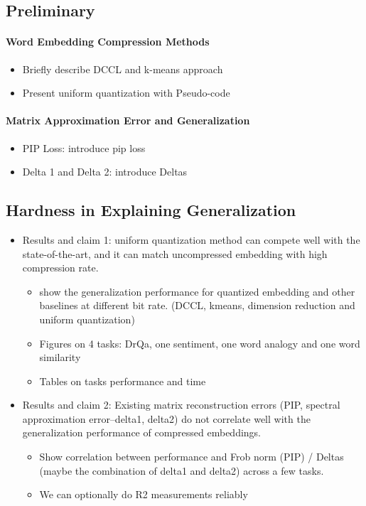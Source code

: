 \subsection{Preliminary}
\label{subsec:prel}
\paragraph{Word Embedding Compression Methods}
\begin{itemize}
	\item Briefly describe DCCL and k-means approach
	\item Present uniform quantization with Pseudo-code
\end{itemize}

\paragraph{Matrix Approximation Error and Generalization}
	\begin{itemize}
		\item PIP Loss: introduce pip loss
		\item Delta 1 and Delta 2: introduce Deltas
	\end{itemize}
	
\subsection{Hardness in Explaining Generalization}
\label{subsec:hard_explain}
	\begin{itemize}
		\item Results and claim 1: uniform quantization method can compete well with the state-of-the-art, and it can match uncompressed embedding with high compression rate.
		\begin{itemize}
			\item show the generalization performance for quantized embedding and other baselines at different bit rate. (DCCL, kmeans, dimension reduction and uniform quantization)
			\item Figures on 4 tasks: DrQa, one sentiment, one word analogy and one word similarity
			\item Tables on tasks performance and time
		\end{itemize}
		\item Results and claim 2: Existing matrix reconstruction errors (PIP, spectral approximation error--delta1, delta2) do not correlate well with the generalization performance of compressed embeddings.
		\begin{itemize}
			\item Show correlation between performance and Frob norm (PIP) / Deltas (maybe the combination of delta1 and delta2) across a few tasks.
			\item We can optionally do R2 measurements reliably
		\end{itemize}
	\end{itemize}